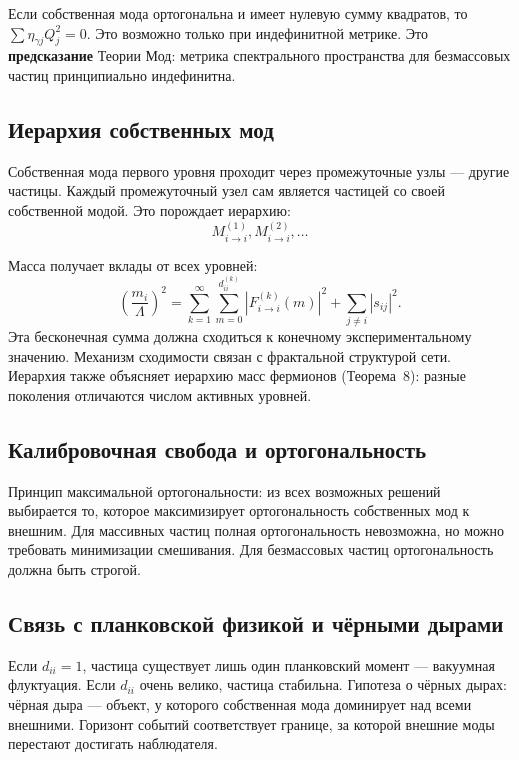 \documentclass[12pt,a4paper]{article}
\begin{document}
Если собственная мода ортогональна и имеет нулевую сумму квадратов, то $\sum \eta_{\gamma j} Q_j^2 = 0$. Это возможно только при индефинитной метрике. Это \textbf{предсказание} Теории Мод: метрика спектрального пространства для безмассовых частиц принципиально индефинитна.

\subsection{Иерархия собственных мод}
Собственная мода первого уровня проходит через промежуточные узлы --- другие частицы. Каждый промежуточный узел сам является частицей со своей собственной модой. Это порождает иерархию:
\begin{equation}
    M_{i \to i}^{(1)}, M_{i \to i}^{(2)}, \dots
\end{equation}

Масса получает вклады от всех уровней:
\begin{equation}
    \left( \frac{m_i}{\Lambda} \right)^2 = \sum_{k=1}^{\infty} \sum_{m=0}^{d_{ii}^{(k)}} |F_{i \to i}^{(k)}(m)|^2 + \sum_{j \neq i} |s_{ij}|^2.
\end{equation}
Эта бесконечная сумма должна сходиться к конечному экспериментальному значению. Механизм сходимости связан с фрактальной структурой сети. Иерархия также объясняет иерархию масс фермионов (Теорема~8): разные поколения отличаются числом активных уровней.

\subsection{Калибровочная свобода и ортогональность}
Принцип максимальной ортогональности: из всех возможных решений выбирается то, которое максимизирует ортогональность собственных мод к внешним. Для массивных частиц полная ортогональность невозможна, но можно требовать минимизации смешивания. Для безмассовых частиц ортогональность должна быть строгой.

\subsection{Связь с планковской физикой и чёрными дырами}
Если $d_{ii} = 1$, частица существует лишь один планковский момент --- вакуумная флуктуация. Если $d_{ii}$ очень велико, частица стабильна. Гипотеза о чёрных дырах: чёрная дыра --- объект, у которого собственная мода доминирует над всеми внешними. Горизонт событий соответствует границе, за которой внешние моды перестают достигать наблюдателя.
\end{document}

